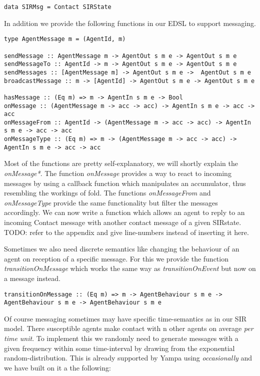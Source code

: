 \begin{verbatim}
data SIRMsg = Contact SIRState
\end{verbatim}

In addition we provide the following functions in our EDSL to support messaging.

\begin{verbatim}
type AgentMessage m = (AgentId, m)

sendMessage :: AgentMessage m -> AgentOut s m e -> AgentOut s m e
sendMessageTo :: AgentId -> m -> AgentOut s m e -> AgentOut s m e
sendMessages :: [AgentMessage m] -> AgentOut s m e ->  AgentOut s m e
broadcastMessage :: m -> [AgentId] -> AgentOut s m e -> AgentOut s m e

hasMessage :: (Eq m) => m -> AgentIn s m e -> Bool
onMessage :: (AgentMessage m -> acc -> acc) -> AgentIn s m e -> acc -> acc
onMessageFrom :: AgentId -> (AgentMessage m -> acc -> acc) -> AgentIn s m e -> acc -> acc
onMessageType :: (Eq m) => m -> (AgentMessage m -> acc -> acc) -> AgentIn s m e -> acc -> acc
\end{verbatim}

Most of the functions are pretty self-explanatory, we will shortly explain the \textit{onMessage*}. The function \textit{onMessage} provides a way to react to incoming messages by using a callback function which manipulates an accumulator, thus resembling the workings of fold. The functions \textit{onMessageFrom} and \textit{onMessageType} provide the same functionality but filter the messages accordingly. We can now write a function which allows an agent to reply to an incoming Contact message with another contact message of a given SIRstate. TODO: refer to the appendix and give line-numbers instead of inserting it here.

Sometimes we also need discrete semantics like changing the behaviour of an agent on reception of a specific message. For this we provide the function \textit{transitionOnMessage} which works the same way as \textit{transitionOnEvent} but now on a message instead.

\begin{verbatim}
transitionOnMessage :: (Eq m) => m -> AgentBehaviour s m e -> AgentBehaviour s m e -> AgentBehaviour s m e
\end{verbatim}

Of course messaging sometimes may have specific time-semantics as in our SIR model. There susceptible agents make contact with n other agents on average \textit{per time unit}. To implement this we randomly need to generate messages with a given frequency within some time-interval by drawing from the exponential random-distribution. This is already supported by Yampa using \textit{occasionally} and we have built on it a the following:

